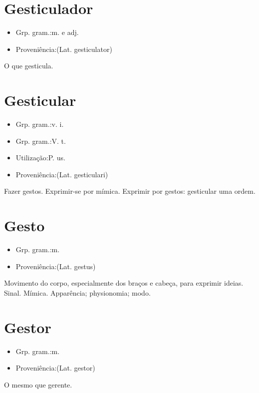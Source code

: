 \section{Gesticulador}
\begin{itemize}
\item {Grp. gram.:m.  e  adj.}
\end{itemize}
\begin{itemize}
\item {Proveniência:(Lat. \textunderscore gesticulator\textunderscore )}
\end{itemize}
O que gesticula.
\section{Gesticular}
\begin{itemize}
\item {Grp. gram.:v. i.}
\end{itemize}
\begin{itemize}
\item {Grp. gram.:V. t.}
\end{itemize}
\begin{itemize}
\item {Utilização:P. us.}
\end{itemize}
\begin{itemize}
\item {Proveniência:(Lat. \textunderscore gesticulari\textunderscore )}
\end{itemize}
Fazer gestos.
Exprimir-se por mímica.
Exprimir por gestos: \textunderscore gesticular uma ordem\textunderscore .
\section{Gesto}
\begin{itemize}
\item {Grp. gram.:m.}
\end{itemize}
\begin{itemize}
\item {Proveniência:(Lat. \textunderscore gestus\textunderscore )}
\end{itemize}
Movimento do corpo, especialmente dos braços e cabeça, para exprimir ideias.
Sinal.
Mímica.
Apparência; physionomia; modo.
\section{Gestor}
\begin{itemize}
\item {Grp. gram.:m.}
\end{itemize}
\begin{itemize}
\item {Proveniência:(Lat. \textunderscore gestor\textunderscore )}
\end{itemize}
O mesmo que \textunderscore gerente\textunderscore .
